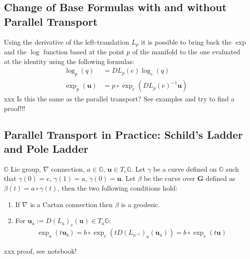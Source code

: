 \subsection{Change of Base Formulas with and without Parallel Transport}
Using the derivative of the left-translation $L_{p}$ it is possible to bring back the $\exp$ and the $\log$ function based at the point $p$ of the manifold to the one evaluated at the identity using the following formulas:
\begin{align*}
\log _{p}(q)  &= DL_{p}(e) \log _{e}(q)  \\
\exp _{p}(\mathbf{u})  &= p\circ \exp_{e} (DL_{p}(e)^{-1} \mathbf{u})
\end{align*}
xxx Is this the same as the parallel transport? See examples and try to find a proof!!!


\subsection{Parallel Transport in Practice: Schild's Ladder and Pole Ladder}




\begin{lemma}
	$\mathbb{G}$ Lie group, $\nabla$ connection, $a\in\mathbb{G}$, $\mathbf{u}\in T_{e}\mathbb{G}$. Let $\gamma$ be a curve defined on $\mathbb{G}$ such that $\gamma(0) = e$, $\gamma(1) = a$, $\dot{\gamma}(0) =\mathbf{u}$. Let $\beta$ be the curve over $\mathbf{G}$ defined as $\beta(t) = a\circ \gamma(t)$, then the two following conditions hold:
	\begin{enumerate}
		\item If $\nabla$ is a Cartan connection then $\beta$ is a geodesic.
		\item For $\mathbf{u}_{a} := D(L_{a})_{e}(\mathbf{u}) \in T_{a}\mathbb{G}$:
		\begin{align}
		\exp_{a}(t\mathbf{u}_{b}) = b\circ \exp_{e}( t D(L_{a^{-1}})_{a}(\mathbf{u}_{a}) ) = b\circ \exp_{e}(t\mathbf{u})
		\end{align}
	\end{enumerate}
\end{lemma}

\noindent
xxx proof, see notebook!

